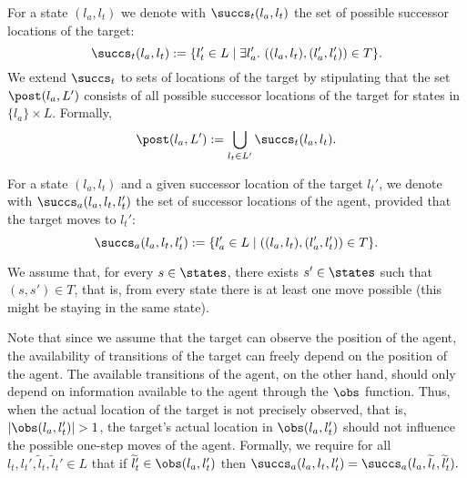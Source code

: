 
For a state $(l_a,l_t)$ we denote with $\succs_t(l_a,l_t)$ the set of possible successor locations of the target:
$$\succs_t(l_a,l_t) := \{l_t' \in L \mid \exists l_a'.\ ((l_a,l_t),(l_a',l_t')) \in T\}.$$
We extend $\succs_t$ to sets of locations of the target by stipulating that the set $\post(l_a,L')$ consists of all possible successor locations of the target for states in $\{l_a\} \times L$. Formally, $$\post(l_a, L') := \bigcup_{l_t \in L'}\succs_t(l_a,l_t).$$

For a state $(l_a,l_t)$ and a given successor location of the target $l_t'$, we denote with $\succs_a(l_a,l_t,l_t')$ the set of successor locations of the agent, provided that the target moves to $l_t'$: 
$$\succs_a(l_a,l_t,l_t') := \{l_a' \in L \mid  ((l_a,l_t),(l_a',l_t')) \in T\}.$$

We assume that, for every $s \in \states$, there exists $s' \in \states$ such that $(s,s') \in T$, that is, from every state there is at least one move possible (this might be staying in the same state). 


Note that since we assume that the target can observe the position of the agent, the availability of transitions of the target can freely depend on the position of the agent. The available transitions of the agent, on the other hand, should only depend on information available to the agent through the $\obs$ function. Thus, when the actual location of the target is not precisely observed, that is, $|\obs(l_a,l_t')|> 1$, the target's actual location in $\obs(l_a,l_t')$ should not influence the possible one-step moves of the agent. Formally, we require for all $l_t,l_t',\widetilde l_t,\widetilde l_t' \in L$ that if
$\widetilde l_t' \in \obs(l_a,l_t')$ then $\succs_a(l_a,l_t,l_t') = \succs_a(l_a,\widetilde l_t,\widetilde l_t').$

